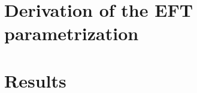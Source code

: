 \documentclass[11pt]{article}
\begin{document}
\setcounter{section}{6}
\section{Derivation of the EFT parametrization}
\setcounter{subsection}{2}



\clearpage
\setcounter{section}{8}
\section{Results}
\setcounter{subsection}{3}




\end{document}
